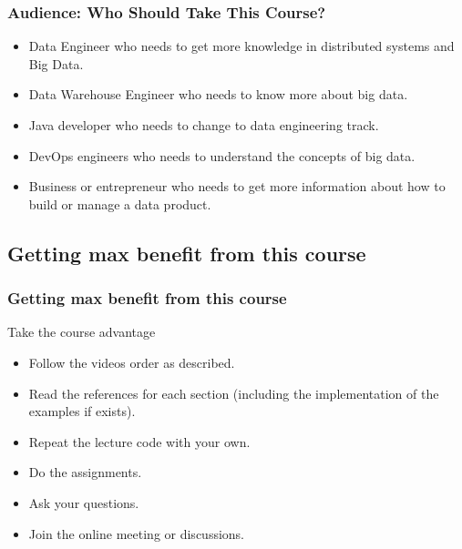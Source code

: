 \begin{frame}
\frametitle{Audience: Who Should Take This Course?}

\begin{itemize}
	\item<1-> Data Engineer who needs to get more knowledge in distributed systems and Big Data. \pause
	\item<2-> Data Warehouse Engineer who needs to know more about big data. \pause
	\item<3-> Java developer who needs to change to data engineering track.  \pause
	\item<4-> DevOps engineers who needs to understand the concepts of big data.  \pause
	\item<5-> Business or entrepreneur who needs to get more information about how to build or manage a data product. \pause
\end{itemize}

\end{frame}


\subsection{Getting max benefit from this course}

\begin{frame}
\frametitle{Getting max benefit from this course}
\begin{block}{Take the course advantage}
\begin{itemize}
	\item<1-> Follow the videos order as described. \pause
	\item<2-> Read the references for each section (including the implementation of the examples if exists). \pause
	\item<3-> Repeat the lecture code with your own.  \pause
	\item<4-> Do the assignments.\pause
	\item<5-> Ask your questions. \pause
	\item<6-> Join the online meeting or discussions. \pause
\end{itemize}
\end{block}

\end{frame}


